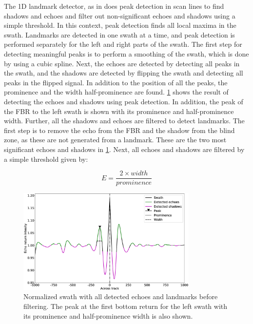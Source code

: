 The 1D landmark detector, as in \cite{Al-Rawi2017LandmarkImages,} does peak detection in scan lines to find shadows and echoes and filter out non-significant echoes and shadows using a simple threshold. In this context, peak detection finds all local maxima in the swath. Landmarks are detected in one swath at a time, and peak detection is performed separately for the left and right parts of the swath. The first step for detecting meaningful peaks is to perform a smoothing of the swath, which is done by using a cubic spline. Next, the echoes are detected by detecting all peaks in the swath, and the shadows are detected by flipping the swath and detecting all peaks in the flipped signal. In addition to the position of all the peaks, the prominence and the width half-prominence are found. \cref{fig:1D_swath_w_landmarks} shows the result of detecting the echoes and shadows using peak detection. In addition, the peak of the FBR to the left swath is shown with its prominence and half-prominence width.
Further, all the shadows and echoes are filtered to detect landmarks. The first step is to remove the echo from the FBR and the shadow from the blind zone, as these are not generated from a landmark. These are the two most significant echoes and shadows in \cref{fig:1D_swath_w_landmarks}. Next, all echoes and shadows are filtered by a simple threshold given by:

\begin{equation}
    E = \frac{2\times width}{prominence}
    \label{eq:1D_thres}
\end{equation}

\begin{figure}
    \centering
    \includegraphics[width=0.8\textwidth]{figures/1D_swath_w_landmarks.eps}
    \caption{Normalized swath with all detected echoes and landmarks before filtering. The peak at the first bottom return for the left swath with its prominence and half-prominence width is also shown.}
    \label{fig:1D_swath_w_landmarks}
\end{figure}


